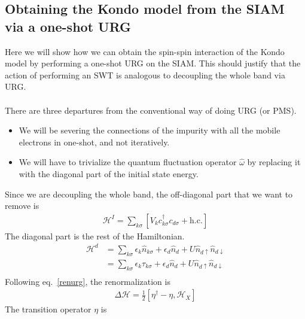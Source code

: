 \documentclass[twoside]{report}
\numberwithin{equation}{section}
\begin{document}
\subsection{Obtaining the Kondo model from the SIAM via a one-shot URG}\label{SWT from URG}
Here we will show how we can obtain the spin-spin interaction of the Kondo model by performing a one-shot URG on the SIAM. This should justify that the action of performing an SWT is analogous to decoupling the whole band via URG. \\\\There are three departures from the conventional way of doing URG (or PMS).
\begin{itemize}
    \item We will be severing the connections of the impurity with all the mobile electrons in one-shot, and not iteratively.
    \item We will have to trivialize the quantum fluctuation operator \(\hat \omega\) by replacing it with the diagonal part of the initial state energy.
\end{itemize}
Since we are decoupling the whole band, the off-diagonal part that we want to remove is
\begin{equation}\begin{aligned}
	\mathcal{H}^I = \sum_{k\sigma}\left[V_k c^\dagger_{k\sigma}c_{d\sigma}+\text{h.c.}\right]
\end{aligned}\end{equation}
The diagonal part is the rest of the Hamiltonian.
\begin{equation}\begin{aligned}
\mathcal{H}^d &= \sum_{k\sigma}\epsilon_k\hat n_{k\sigma} + \epsilon_d\hat n_d + U\hat n_{d\uparrow}\hat n_{d\downarrow}\\
&= \sum_{k\sigma}\epsilon_k\tau_{k\sigma} + \epsilon_d\hat n_d + U\hat n_{d\uparrow}\hat n_{d\downarrow}\\
\end{aligned}\end{equation}
Following eq.~\ref{renurg}, the renormalization is
\begin{equation}\begin{aligned}
	\Delta \mathcal{H} = \frac{1}{2}\left[\eta^\dagger - \eta, \mathcal{H}_X\right]
\end{aligned}\end{equation}
The transition operator \(\eta\) is
\end{document}
